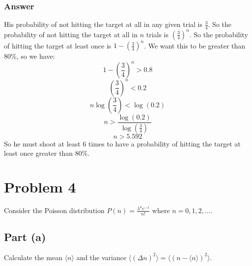 \documentclass{article}
\begin{document}
\subsubsection{Answer}
His probability of not hitting the target at all in any given trial is $\frac{3}{4}$. So the probability of not hitting the target at all in $n$ trials is $\left(\frac{3}{4}\right)^n$. So the probability of hitting the target at least once is $1 - \left(\frac{3}{4}\right)^n$. We want this to be greater than 80\%, so we have:
\begin{equation}
    1 - \left(\frac{3}{4}\right)^n > 0.8
\end{equation}
\begin{equation}
    \left(\frac{3}{4}\right)^n < 0.2
\end{equation}
\begin{equation}
    n \log\left(\frac{3}{4}\right) < \log(0.2)
\end{equation}
\begin{equation}
    n > \frac{\log(0.2)}{\log\left(\frac{3}{4}\right)}
\end{equation}
\begin{equation}
    n > 5.592
\end{equation}
So he must shoot at least 6 times to have a probability of hitting the target at least once greater than 80\%.

\section{Problem 4}
Consider the Poisson distribution \( P(n) = \frac{\lambda^n e^{-\lambda}}{n!} \) where \( n = 0, 1, 2, \ldots \).

\subsection{Part (a)}
Calculate the mean \( \langle n \rangle \) and the variance \( \langle (\Delta n)^2 \rangle = \langle (n - \langle n \rangle)^2 \rangle \).
\end{document}
